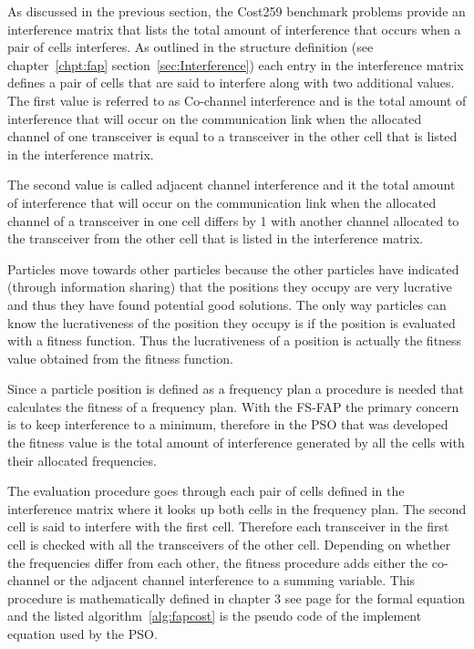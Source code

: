 As discussed in the previous section, the Cost259 benchmark problems provide an interference matrix that lists the total amount of interference that occurs when a pair of cells interferes. As outlined in the structure definition (see chapter~\ref{chpt:fap} section~\ref{sec:Interference}) each entry in the interference matrix defines a pair of cells that are said to interfere along with two additional values. The first value is referred to as Co-channel interference and is the total amount of interference that will occur on the communication link when the allocated channel of one transceiver is equal to a transceiver in the other cell that is listed in the interference matrix. 

The second value is called adjacent channel interference and it the total amount of interference that will occur on the communication link when the allocated channel of a transceiver in one cell differs by 1 with another channel allocated to the transceiver from the other cell that is listed in the interference matrix.

Particles move towards other particles because the other particles have indicated (through information sharing) that the positions they occupy are very lucrative and thus they have found potential good solutions. The only way particles can know the lucrativeness of the position they occupy is if the position is evaluated with a fitness function. Thus the lucrativeness of a position is actually the fitness value obtained from the fitness function. 

Since a particle position is defined as a frequency plan a procedure is needed that calculates the fitness of a frequency plan. With the FS-FAP the primary concern is to keep interference to a minimum, therefore in the PSO that was developed the fitness value is the total amount of interference generated by all the cells with their allocated frequencies. 

The evaluation procedure goes through each pair of cells defined in the interference matrix where it looks up both cells in the frequency plan. The second cell is said to interfere with the first cell. Therefore each transceiver in the first cell is checked with all the transceivers of the other cell. Depending on whether the frequencies differ from each other, the fitness procedure adds either the co-channel or the adjacent channel interference to a summing variable. This procedure is mathematically defined in chapter 3 see page \pageref{E:costFunction} for the formal equation and the listed algorithm~\ref{alg:fapcost} is the pseudo code of the implement equation used by the PSO. 

